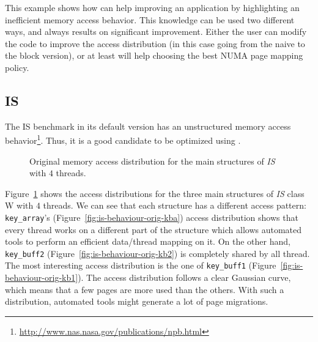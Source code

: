 This example shows
how \TABARNAC can help improving an application by highlighting an inefficient
memory access behavior. This knowledge can be used two different ways, and always
results on significant improvement. Either the user can modify the code to
improve the access distribution (in this case going from the naive to the block version),
or at least \TABARNAC will help choosing the best NUMA page mapping policy.

\subsection{IS}
\label{sec:exp-is}

The IS benchmark in its default version has an unstructured memory access behavior\footnote{\url{http://www.nas.nasa.gov/publications/npb.html}}. Thus, it is a good candidate to be optimized using \TABARNAC.

\begin{figure}[htb]
    \centering

    \caption{Original memory access distribution for the main structures of
        \emph{IS} with $4$ threads.}
    \label{fig:is-behaviour-orig}
\end{figure}

Figure~\ref{fig:is-behaviour-orig} shows the access distributions for the
three main structures of \emph{IS} class W with $4$ threads. We can see that
each structure has a different access pattern: \texttt{key\_array}'s
(Figure~\ref{fig:is-behaviour-orig-kba}) access distribution shows that every
thread works on a different part of the structure which allows automated
tools to perform an efficient data/thread mapping on it. On the other hand, \texttt{key\_buff2}
(Figure~\ref{fig:is-behaviour-orig-kb2}) is completely shared by all thread.
The most interesting access distribution is the one of \texttt{key\_buff1}
(Figure~\ref{fig:is-behaviour-orig-kb1}). The access distribution follows a clear Gaussian curve, which means that a few pages are more used than the
others. With such a distribution, automated tools might generate a lot of page
migrations.

